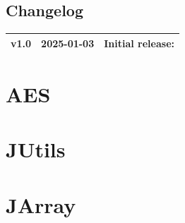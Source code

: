 \documentclass[11pt,openany]{article}
\begin{document}
\vfill
\subsection*{Changelog}
\large
\begin{tabular}{@{} L{0.05\textwidth} L{0.2\textwidth} L{0.7\textwidth} @{}} %
	\toprule
	v1.0 & 2025-01-03 & Initial release: \\%
	\bottomrule
\end{tabular}

\newpage


\tableofcontents

\newpage
\section{AES}


\newpage
\section{JUtils}


\newpage
\section{JArray}


\vfill
\begin{thebibliography}{9}\large
\end{thebibliography}

\newpage
\appendix

%
\end{document}
